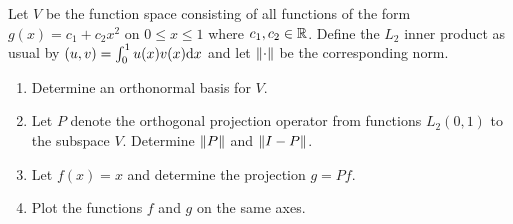 \documentclass[10pt]{article}
\begin{document}
\begin{problem}
    Let \( V \) be the function space consisting of all functions of the form \( g(x) = c_1 + c_2 x^2 \) on \( 0\leq x\leq 1 \) where \( c_1,c_2\in\mathbb{R} \). Define the \( L_2 \) inner product as usual by \( (u,v) = \int_0^1 u(x)v(x)\mathrm{d} x \) and let \( \left\lVert\cdot\right\rVert \) be the corresponding norm.
    \begin{enumerate}[label=(\alph*),nolistsep]
        \item Determine an orthonormal basis for \( V \).
        \item Let \( P \) denote the orthogonal projection operator from functions \( L_2(0,1) \) to the subspace \( V \). Determine \( \left\lVert P\right\rVert \) and \( \left\lVert I-P\right\rVert \).
        \item Let \( f(x) = x \) and determine the projection \( g = Pf \).
        \item Plot the functions \( f \) and \( g \) on the same axes.        
    \end{enumerate}    
\end{problem}
\end{document}
